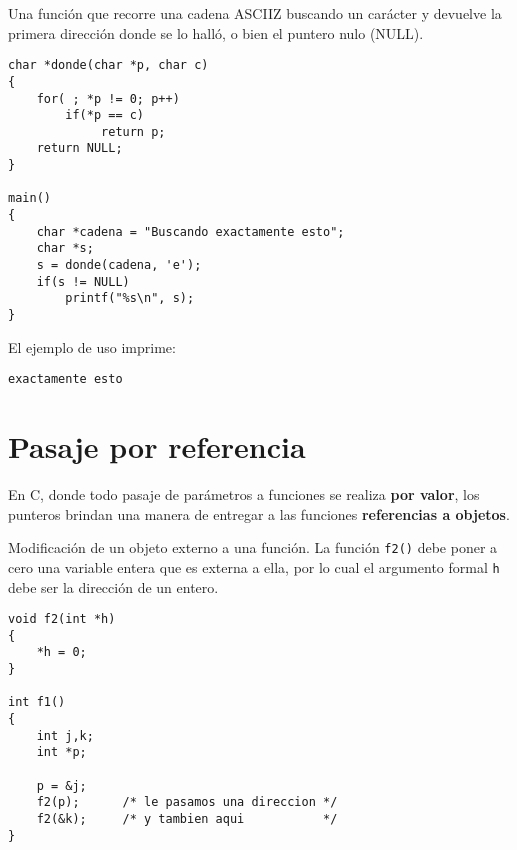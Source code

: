 \begin{ejemplo}
Una función que recorre una cadena ASCIIZ buscando un carácter y devuelve la
primera dirección donde se lo halló, o bien el puntero nulo (NULL).
\begin{lstlisting}
char *donde(char *p, char c)
{
    for( ; *p != 0; p++)
        if(*p == c)
             return p;
    return NULL;
}

main()
{
    char *cadena = "Buscando exactamente esto";
    char *s;
    s = donde(cadena, 'e');
    if(s != NULL)
        printf("%s\n", s);
}
\end{lstlisting}

El ejemplo de uso imprime:
\begin{lstlisting}
exactamente esto
\end{lstlisting}
\end{ejemplo}

\section{Pasaje por referencia}
En C, donde todo pasaje de parámetros a funciones se realiza \textbf{por valor}, los punteros
brindan una manera de entregar a las funciones \textbf{referencias a objetos}. 


\begin{ejemplo}
Modificación de un objeto externo a una función.
La función \texttt{f2()} debe poner a cero una variable entera que es externa a ella, por lo cual el argumento
formal \texttt{h} debe ser la dirección de un entero.
\begin{lstlisting}
void f2(int *h)
{
    *h = 0;
}

int f1()
{
    int j,k;
    int *p;

    p = &j;
    f2(p);		/* le pasamos una direccion */
    f2(&k);		/* y tambien aqui           */
}
\end{lstlisting}
\end{ejemplo}

